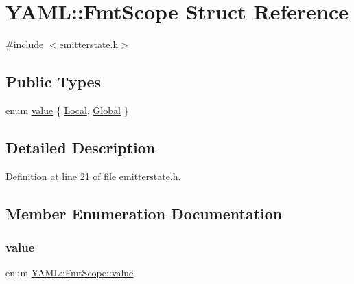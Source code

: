 \hypertarget{struct_y_a_m_l_1_1_fmt_scope}{}\section{Y\+A\+ML\+::Fmt\+Scope Struct Reference}
\label{struct_y_a_m_l_1_1_fmt_scope}


{\ttfamily \#include $<$emitterstate.\+h$>$}

\subsection*{Public Types}
\begin{DoxyCompactItemize}
\item 
enum \mbox{\hyperlink{struct_y_a_m_l_1_1_fmt_scope_a58c967eadfafdc79f62cd5c59ec2b1fe}{value}} \{ \mbox{\hyperlink{struct_y_a_m_l_1_1_fmt_scope_a58c967eadfafdc79f62cd5c59ec2b1fea50fd74375e1d5cfdb9afacb58e750a86}{Local}}, 
\mbox{\hyperlink{struct_y_a_m_l_1_1_fmt_scope_a58c967eadfafdc79f62cd5c59ec2b1fea135a8cbbd9569fc49ed1044e10748cfd}{Global}}
 \}
\end{DoxyCompactItemize}


\subsection{Detailed Description}


Definition at line 21 of file emitterstate.\+h.



\subsection{Member Enumeration Documentation}
\mbox{\label{struct_y_a_m_l_1_1_fmt_scope_a58c967eadfafdc79f62cd5c59ec2b1fe}} 
\subsubsection{\texorpdfstring{value}{value}}
{\footnotesize\ttfamily enum \mbox{\hyperlink{struct_y_a_m_l_1_1_fmt_scope_a58c967eadfafdc79f62cd5c59ec2b1fe}{Y\+A\+M\+L\+::\+Fmt\+Scope\+::value}}}

